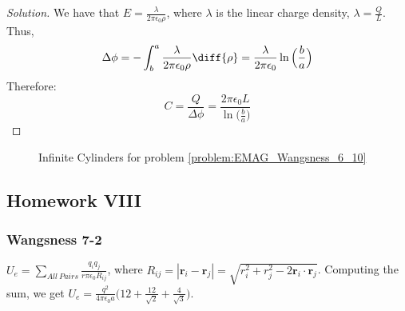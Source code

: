             \begin{proof}[Solution]
                We have that
                $E=\frac{\lambda}{2\pi \epsilon_0 \rho}$,
                where $\lambda$
                is the linear charge density,
                $\lambda=\frac{Q}{L}$.
                Thus,
                \begin{equation*}
                    \Delta\phi=-\int_{b}^{a}
                    \frac{\lambda}{2\pi\epsilon_0\rho}\diff{\rho}
                    =\frac{\lambda}{2\pi\epsilon_{0}}
                    \ln\Big(\frac{b}{a}\Big)    
                \end{equation*}
                Therefore:
                \begin{equation*}
                    C=\frac{Q}{\Delta\phi}
                    =\frac{2\pi\epsilon_{0}L}
                          {\ln\big(\frac{b}{a}\big)}
                \end{equation*}
            \end{proof}
            \begin{figure}[H]
                \centering
                \captionsetup{type=figure}
                
                \caption{%
                    Infinite Cylinders for problem
                    \ref{problem:EMAG_Wangsness_6_10}
                }
                \label{fig:EMAG_Wangsness_6_10}
            \end{figure}
        \subsection{Homework VIII}
            \subsubsection{Wangsness 7-2}
                $U_e=\underset{All\ Pairs}\sum\frac{q_i q_j}{r\pi\epsilon_0 R_{ij}}$,
                where $R_{ij}=|\mathbf{r}_i-\mathbf{r}_j|=\sqrt{r_i^2+r_j^2 -2\mathbf{r}_i\cdot \mathbf{r}_j}$.
                Computing the sum, we get
                $U_e=\frac{q^2}{4\pi\epsilon_0 a}\big(12+\frac{12}{\sqrt{2}}+\frac{4}{\sqrt{3}}\big)$.
